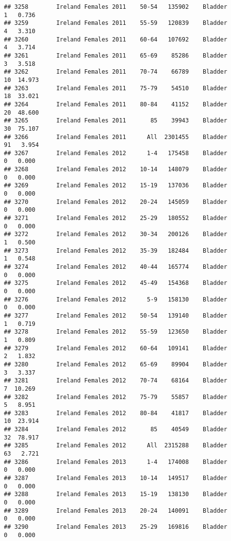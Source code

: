 \documentclass[
]{article}
\begin{document}
\begin{verbatim}
## 3258        Ireland Females 2011    50-54   135902    Bladder      1   0.736
## 3259        Ireland Females 2011    55-59   120839    Bladder      4   3.310
## 3260        Ireland Females 2011    60-64   107692    Bladder      4   3.714
## 3261        Ireland Females 2011    65-69    85286    Bladder      3   3.518
## 3262        Ireland Females 2011    70-74    66789    Bladder     10  14.973
## 3263        Ireland Females 2011    75-79    54510    Bladder     18  33.021
## 3264        Ireland Females 2011    80-84    41152    Bladder     20  48.600
## 3265        Ireland Females 2011       85    39943    Bladder     30  75.107
## 3266        Ireland Females 2011      All  2301455    Bladder     91   3.954
## 3267        Ireland Females 2012      1-4   175458    Bladder      0   0.000
## 3268        Ireland Females 2012    10-14   148079    Bladder      0   0.000
## 3269        Ireland Females 2012    15-19   137036    Bladder      0   0.000
## 3270        Ireland Females 2012    20-24   145059    Bladder      0   0.000
## 3271        Ireland Females 2012    25-29   180552    Bladder      0   0.000
## 3272        Ireland Females 2012    30-34   200126    Bladder      1   0.500
## 3273        Ireland Females 2012    35-39   182484    Bladder      1   0.548
## 3274        Ireland Females 2012    40-44   165774    Bladder      0   0.000
## 3275        Ireland Females 2012    45-49   154368    Bladder      0   0.000
## 3276        Ireland Females 2012      5-9   158130    Bladder      0   0.000
## 3277        Ireland Females 2012    50-54   139140    Bladder      1   0.719
## 3278        Ireland Females 2012    55-59   123650    Bladder      1   0.809
## 3279        Ireland Females 2012    60-64   109141    Bladder      2   1.832
## 3280        Ireland Females 2012    65-69    89904    Bladder      3   3.337
## 3281        Ireland Females 2012    70-74    68164    Bladder      7  10.269
## 3282        Ireland Females 2012    75-79    55857    Bladder      5   8.951
## 3283        Ireland Females 2012    80-84    41817    Bladder     10  23.914
## 3284        Ireland Females 2012       85    40549    Bladder     32  78.917
## 3285        Ireland Females 2012      All  2315288    Bladder     63   2.721
## 3286        Ireland Females 2013      1-4   174008    Bladder      0   0.000
## 3287        Ireland Females 2013    10-14   149517    Bladder      0   0.000
## 3288        Ireland Females 2013    15-19   138130    Bladder      0   0.000
## 3289        Ireland Females 2013    20-24   140091    Bladder      0   0.000
## 3290        Ireland Females 2013    25-29   169816    Bladder      0   0.000

\end{verbatim}
\end{document}
